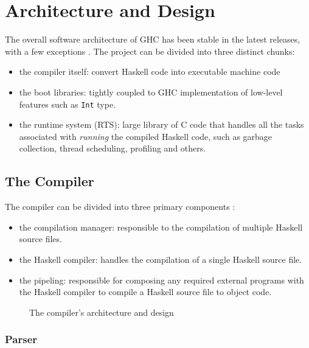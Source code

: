 \section{Architecture and Design}
\label{sec::architecure}

The overall software architecture of GHC has been stable in the latest releases, with a few exceptions \cite{wilson2011architecture}. The project can be divided into three distinct chunks:

\begin{itemize}
    \item the compiler itself: convert Haskell code into executable machine code \cite{wilson2011architecture}
    \item the boot libraries: tightly coupled to GHC implementation of low-level features such as \texttt{Int}
    type.
    \item the runtime system (RTS): large library of C code that handles all the tasks associated with \textit{running} the compiled Haskell code, such as garbage collection, thread scheduling, profiling and others. \cite{wilson2011architecture}
\end{itemize}

\subsection{The Compiler}

The compiler can be divided into three primary components \cite{wilson2011architecture}:
\begin{itemize}
    \item the compilation manager: responsible to the compilation of multiple Haskell source files.
    \item the Haskell compiler: handles the compilation of a single Haskell source file.
    \item the pipeling: responsible for composing any required external programs with the Haskell compiler to compile a Haskell source file to object code.
\end{itemize}

\begin{figure}
    \centering
    
    \caption{The compiler's architecture and design}
    \label{fig::compiler::architecture::design}
\end{figure}

\subsubsection{Parser}

